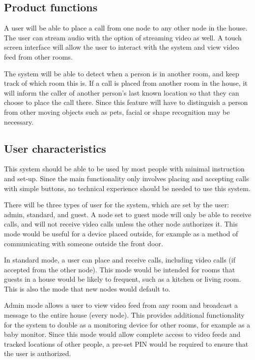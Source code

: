 \documentclass[onecolumn, draftclsnofoot,10pt, compsoc]{IEEEtran}
\begin{document}
\subsection{Product functions}
A user will be able to place a call from one node to any other node in the house. The user can stream audio with the option of streaming video as well. A touch screen interface will allow the user to interact with the system and view video feed from other rooms. 

\noindent The system will be able to detect when a person is in another room, and keep track of which room this is. If a call is placed from another room in the house, it will inform the caller of another person’s last known location so that they can choose to place the call there. Since this feature will have to distinguish a person from other moving objects such as pets, facial or shape recognition may be necessary. 

\subsection{User characteristics}
This system should be able to be used by most people with minimal instruction and set-up. Since the main functionality only involves placing and accepting calls with simple buttons, no technical experience should be needed to use this system. 

\noindent There will be three types of user for the system, which are set by the user: admin, standard, and guest. A node set to guest mode will only be able to receive calls, and will not receive video calls unless the other node authorizes it. This mode would be useful for a device placed outside, for example as a method of communicating with someone outside the front door. 

\noindent In standard mode, a user can place and receive calls, including video calls (if accepted from the other node). This mode would be intended for rooms that guests in a house would be likely to frequent, such as a kitchen or living room. This is also the mode that new nodes would default to. 

\noindent Admin mode allows a user to view video feed from any room and broadcast a message to the entire house (every node). This provides additional functionality for the system to double as a monitoring device for other rooms, for example as a baby monitor. Since this mode would allow complete access to video feeds and tracked locations of other people, a pre-set PIN would be required to ensure that the user is authorized.   
\end{document}
